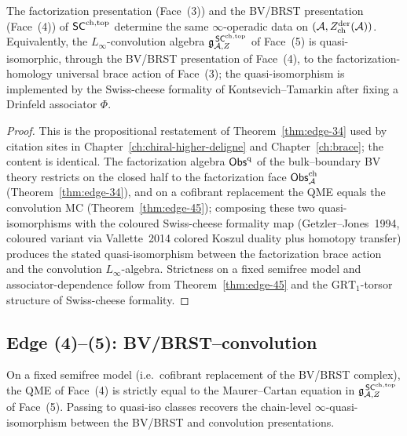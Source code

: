 \begin{proposition}\label{prop:heptagon-edge-34}%
%
The factorization presentation (Face~(3)) and the BV/BRST presentation
(Face~(4)) of $\mathsf{SC}^{\mathrm{ch},\mathrm{top}}$ determine the same $\infty$-operadic data on
$(\mathcal{A}, Z^{\mathrm{der}}_{\mathrm{ch}}(\mathcal{A}))$. Equivalently, the
$L_\infty$-convolution algebra $\mathfrak{g}^{\,\mathsf{SC}^{\mathrm{ch},\mathrm{top}}}_{\mathcal{A},Z}$ of Face~(5)
is quasi-isomorphic, through the BV/BRST presentation of Face~(4), to
the factorization-homology universal brace action of Face~(3); the
quasi-isomorphism is implemented by the Swiss-cheese formality of
Kontsevich--Tamarkin after fixing a Drinfeld associator $\Phi$.
\end{proposition}

\begin{proof}
This is the propositional restatement of Theorem~\ref{thm:edge-34}
used by citation sites in Chapter~\ref{ch:chiral-higher-deligne} and
Chapter~\ref{ch:brace}; the content is identical. The factorization
algebra $\mathsf{Obs}^{\mathrm{q}}$ of the bulk--boundary BV theory restricts
on the closed half to the factorization face $\mathsf{Obs}^{\mathrm{ch}}_{\mathcal{A}}$
(Theorem~\ref{thm:edge-34}), and on a cofibrant replacement the QME
equals the convolution MC (Theorem~\ref{thm:edge-45}); composing these
two quasi-isomorphisms with the coloured Swiss-cheese formality map
(Getzler--Jones~1994, coloured variant via Vallette~2014 colored Koszul
duality plus homotopy transfer) produces the stated quasi-isomorphism
between the factorization brace action and the convolution
$L_\infty$-algebra. Strictness on a fixed semifree model and
associator-dependence follow from Theorem~\ref{thm:edge-45} and the
$\mathrm{GRT}_1$-torsor structure of Swiss-cheese formality.
\end{proof}

\subsection{Edge (4)--(5): BV/BRST--convolution}\label{subsec:edge-45}

\begin{theorem}
\label{thm:edge-45}%
On a fixed semifree model (i.e.\ cofibrant replacement of the
BV/BRST complex), the QME of Face~(4) is strictly equal to the
Maurer--Cartan equation in $\mathfrak{g}^{\,\mathsf{SC}^{\mathrm{ch},\mathrm{top}}}_{\mathcal{A},Z}$ of Face~(5).
Passing to quasi-iso classes recovers the chain-level
$\infty$-quasi-isomorphism between the BV/BRST and convolution
presentations.
\end{theorem}

